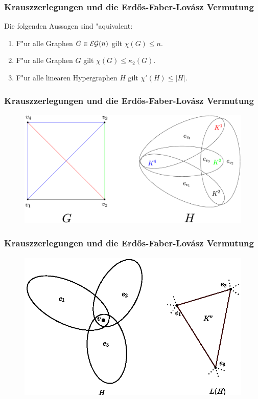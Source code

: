 \documentclass{beamer}
\begin{document}
\begin{frame}[<+->]
  \frametitle{Krauszzerlegungen und die Erd\H os-Faber-Lov\'asz Vermutung}
  \begin{theorem}
    Die folgenden Aussagen sind "aquivalent:
    \begin{enumerate}[<+->]
      \item F"ur alle Graphen $G\in {\cal EG}(n)$ gilt $\chi(G) \leq n$.
      \item F"ur alle Graphen $G$ gilt $\chi(G) \leq \kappa_{2}(G)$.
      \item F"ur alle linearen Hypergraphen $H$ gilt $\chi'(H) \leq |H|$.
    \end{enumerate}
  \end{theorem}
\end{frame}

\begin{frame}
  \frametitle{Krauszzerlegungen und die Erd\H os-Faber-Lov\'asz Vermutung}
\begin{figure}[h]
  \centering
  \includegraphics[width=\textwidth]{images/k4krausztohypergraph}
\end{figure}
\end{frame}
\begin{frame}
  \frametitle{Krauszzerlegungen und die Erd\H os-Faber-Lov\'asz Vermutung}
  \begin{figure}[h]
    \centering
    \includegraphics[width=\textwidth]{images/KvLinegraph.eps}
  \end{figure}
\end{frame}
\end{document}
